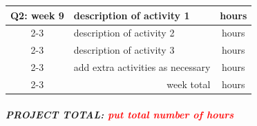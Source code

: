 \documentclass[report,english,cleveref,autoref]{lipics-v2021}
\begin{document}
\begin{tabular}{c| m{10cm}|c}
\hline\hline
Q2: week 9  & description of activity 1 & hours \\
\cline{2-3}
     & description of activity 2 & hours \\
\cline{2-3}
     & description of activity 3 & hours \\
\cline{2-3}
     & add extra activities as necessary & hours \\
\cline{2-3}
     & \multicolumn{1}{r|}{week total} & hours \\
\hline \hline
\end{tabular}

\subparagraph{PROJECT TOTAL: \textcolor{red}{put total number of hours}}

\end{document}
